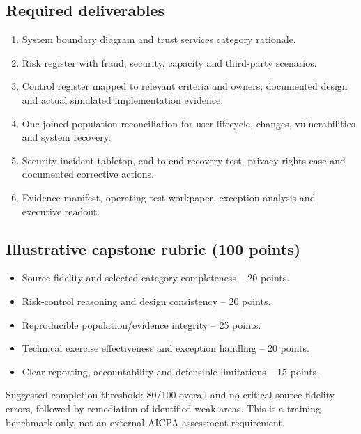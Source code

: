 \documentclass[10pt,oneside]{report}
\begin{document}
\subsection{Required deliverables}
\begin{enumerate}
\item System boundary diagram and trust services category rationale.
\item Risk register with fraud, security, capacity and third-party scenarios.
\item Control register mapped to relevant criteria and owners; documented design and actual simulated implementation evidence.
\item One joined population reconciliation for user lifecycle, changes, vulnerabilities and system recovery.
\item Security incident tabletop, end-to-end recovery test, privacy rights case and documented corrective actions.
\item Evidence manifest, operating test workpaper, exception analysis and executive readout.
\end{enumerate}

\subsection{Illustrative capstone rubric (100 points)}
\begin{itemize}
\item Source fidelity and selected-category completeness -- 20 points.
\item Risk-control reasoning and design consistency -- 20 points.
\item Reproducible population/evidence integrity -- 25 points.
\item Technical exercise effectiveness and exception handling -- 20 points.
\item Clear reporting, accountability and defensible limitations -- 15 points.
\end{itemize}

Suggested completion threshold: 80/100 overall and no critical source-fidelity errors, followed by remediation of identified weak areas. This is a training benchmark only, not an external AICPA assessment requirement.
\end{document}
